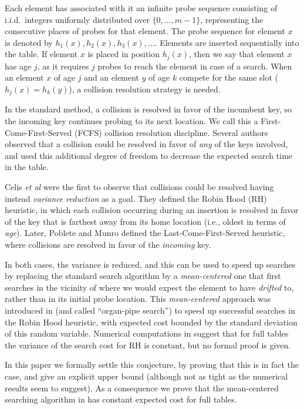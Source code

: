 \documentclass[proceedings]{aofa}
\begin{document}
Each element has associated with it
an infinite probe sequence consisting of
i.i.d.\ integers uniformly distributed over
$\{ 0,\ldots, m-1\}$, representing the
consecutive places of probes for that element.
The probe sequence for element $x$ is
denoted by $h_1(x), h_2(x), h_3(x), \ldots$.
Elements are inserted sequentially into the table.
If element $x$ is placed in position $h_j(x)$,
then we say that element $x$ has age $j$,
as it requires $j$ probes to reach the element in
case of a search.
When an element $x$ of age $j$ and
an element $y$ of age $k$ compete for the same slot ($h_j(x)=h_k(y)$),
a collision resolution strategy is needed.

In the standard method, a collision is resolved in favor of the incumbent key, so the incoming key continues probing to its next location.
We call this a First-Come-First-Served (FCFS) collision resolution discipline.
Several authors \cite{Brent,Amble,GM} observed that a collision could be
resolved in favor of {\it{any}} of the keys involved, and used this
additional degree of freedom to decrease the expected search time in the
table.

Celis {\it{et al}} \cite{CelisT,Celis} were the first to
observe that
collisions could be resolved having instead {\it{variance reduction}} as a goal.
They defined the Robin Hood (RH) heuristic, in which each collision occurring
during an insertion is resolved in
favor of the key that is farthest away from its home location (i.e., oldest in terms of {\em age}).
Later, Poblete and Munro \cite{LCFS} defined the Last-Come-First-Served
heuristic,
where collisions are resolved in favor of the {\em incoming} key. 

In both cases,
the variance is reduced, and this can be used to speed up searches by
replacing
the standard search algorithm by a {\em mean-centered} one that first
searches in the vicinity of where we would expect the element to have
{\em drifted} to, rather than in its initial probe location.
This {\em mean-centered} approach was introduced in
\cite{CelisT} (and called ``organ-pipe search'') to speed up successful searches 
in the Robin Hood heuristic, 
with expected cost bounded by the standard deviation of this random variable. 
Numerical computations in \cite{CelisT} suggest that for
full tables the variance of the search cost for RH is constant, but no formal proof is given. 

In this paper we formally settle this conjecture, by proving that this is
in fact the case, and give an explicit upper bound (although not as tight
as the numerical results seem to suggest). As a consequence we prove
that the mean-centered searching algorithm in \cite{CelisT} has constant
expected cost for full tables.
\end{document}
